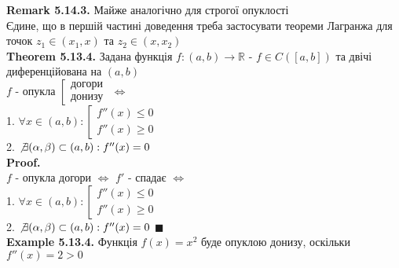 \documentclass[a4paper, 14pt]{extarticle}
\def\bigline{\vspace{5mm}\\}
\def\ex#1{\textbf{Example {#1}}}
\def\rm#1{\textbf{Remark {#1}}}
\def\th#1{\textbf{Theorem {#1}}}
\def\proof{\textbf{Proof.}\\}
\def\bigline{\vspace{5mm}\\}
\def\qed{$\blacksquare$}
\begin{document}
\rm{5.14.3.} Майже аналогічно для строгої опуклості\\
Єдине, що в першій частині доведення треба застосувати теореми Лагранжа для точок $z_1 \in (x_1,x)$ та $z_2 \in (x,x_2)$
\bigline

\th{5.13.4.} Задана функція $f: (a,b) \to \mathbb{R}$ - $f \in C([a,b])$ та двічі диференційована на $(a,b)$\\
$f$ - опукла $\left[ \begin{gathered} \textrm{догори} \\ \textrm{донизу} \end{gathered} \right.$ $\iff$\\
1. $\forall x \in (a,b): \left[ \begin{gathered} f''(x) \leq 0 \\ f''(x) \geq 0 \end{gathered} \right.$\\
2. $\not\exists (\alpha, \beta) \subset (a,b): f''(x) = 0$\\
\proof
$f$ - опукла догори $\iff$ $f'$ - спадає $\iff$ \\
1. $\forall x \in (a,b): \left[ \begin{gathered} f''(x) \leq 0 \\ f''(x) \geq 0 \end{gathered} \right.$\\
2. $\not\exists (\alpha, \beta) \subset (a,b): f''(x) = 0$ \qed
\bigline
\ex{5.13.4.} Функція $f(x) = x^2$ буде опуклою донизу, оскільки\\
$f''(x) = 2 > 0$
\bigline
\end{document}
